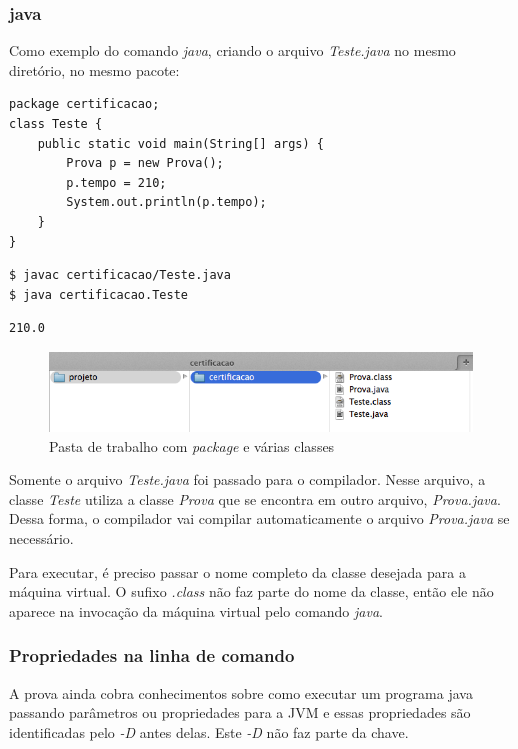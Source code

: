 \documentclass[12pt]{article}
\begin{document}
\subsubsection{java}

Como exemplo do comando \textit{java}, criando o arquivo \textit{Teste.java} no mesmo diretório, no mesmo pacote:

\begin{lstlisting}
package certificacao;
class Teste {
	public static void main(String[] args) {
		Prova p = new Prova();
		p.tempo = 210;
		System.out.println(p.tempo);
	}
}
\end{lstlisting}

\begin{lstlisting}
$ javac certificacao/Teste.java
$ java certificacao.Teste
\end{lstlisting}

\begin{lstlisting}
210.0
\end{lstlisting}

\begin{figure}[H]
	\centering
	\includegraphics[width=0.7\linewidth]{figuras/estrutura3}
	\caption[Pasta de trabalho com \textit{package} e várias classes]{Pasta de trabalho com \textit{package} e várias classes}
	\label{fig:estrutura3}
\end{figure}

Somente o arquivo \textit{Teste.java} foi passado para o compilador. Nesse arquivo, a classe \textit{Teste} utiliza a classe \textit{Prova} que se encontra em outro arquivo, \textit{Prova.java}. Dessa forma, o compilador vai compilar automaticamente o arquivo \textit{Prova.java} se necessário.

Para executar, é preciso passar o nome completo da classe desejada para a máquina virtual. O sufixo \textit{.class} não faz parte do nome da classe, então ele não aparece na invocação da máquina virtual pelo comando \textit{java}.

\subsubsection{Propriedades na linha de comando}

A prova ainda cobra conhecimentos sobre como executar um programa java passando parâmetros ou propriedades para a JVM e essas propriedades são identificadas pelo \textit{-D} antes delas. Este \textit{-D} não faz parte da chave.
\end{document}
